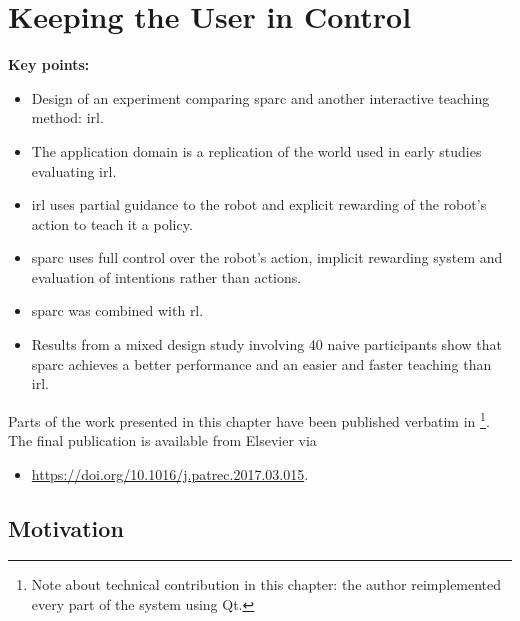 \chapter{Keeping the User in Control}\label{chap:control}
\glsresetall
\graphicspath{{images/control/}}

\newcommand{\nosemic}{\SetEndCharOfAlgoLine{\relax}}%
\newcommand{\dosemic}{\SetEndCharOfAlgoLine{\string;}}%
\newcommand{\pushline}{\Indp}%
\newcommand{\popline}{\Indm\dosemic}%

\begin{framed}
	\textbf{Key points:}
	
	\begin{itemize}
		\item Design of an experiment comparing \acrshort{sparc} and another interactive teaching method: \acrshort{irl}.
		\item The application domain is a replication of the world used in early studies evaluating \acrshort{irl}.
		\item \acrshort{irl} uses partial guidance to the robot and explicit rewarding of the robot's action to teach it a policy.
		\item \acrshort{sparc} uses full control over the robot's action, implicit rewarding system and evaluation of intentions rather than actions.
		\item \acrshort{sparc} was combined with \acrlong{rl}.
		\item Results from a mixed design study involving 40 naive participants show that \acrshort{sparc} achieves a better performance and an easier and faster teaching than \acrshort{irl}.
	\end{itemize}
\end{framed}

Parts of the work presented in this chapter have been published verbatim in \cite{senft2017supervised} \footnote{Note about technical contribution in this chapter: the author reimplemented every part of the system using Qt.}. The final publication is available from Elsevier via
\begin{itemize}
	\item \url{https://doi.org/10.1016/j.patrec.2017.03.015}.
\end{itemize} 

\newpage
\section{Motivation}

